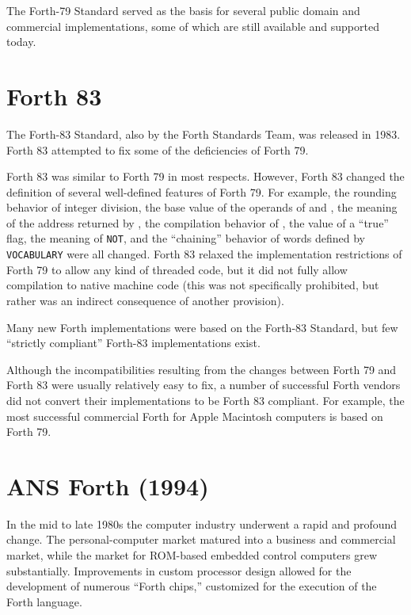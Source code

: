 The Forth-79 Standard served as the basis for several public domain
and commercial implementations, some of which are still available and
supported today.


\section{Forth 83} %

The Forth-83 Standard, also by the Forth Standards Team, was released
in 1983. Forth 83 attempted to fix some of the deficiencies of Forth
79.

Forth 83 was similar to Forth 79 in most respects. However, Forth 83
changed the definition of several well-defined features of Forth 79.
For example, the rounding behavior of integer division, the base value
of the operands of  and , the meaning of the
address returned by , the compilation behavior of ,
the value of a ``true'' flag, the meaning of \texttt{NOT}, and the
``chaining'' behavior of words defined by \texttt{VOCABULARY} were all
changed. Forth 83 relaxed the implementation restrictions of Forth 79
to allow any kind of threaded code, but it did not fully allow
compilation to native machine code (this was not specifically prohibited,
but rather was an indirect consequence of another provision).

Many new Forth implementations were based on the Forth-83 Standard, but
few ``strictly compliant'' Forth-83 implementations exist.

Although the incompatibilities resulting from the changes between
Forth 79 and Forth 83 were usually relatively easy to fix, a number
of successful Forth vendors did not convert their implementations to
be Forth 83 compliant. For example, the most successful commercial
Forth for Apple Macintosh computers is based on Forth 79.


\section{ANS Forth (1994)} %
\label{diff:ans}

In the mid to late 1980s the computer industry underwent a rapid and
profound change.  The personal-computer market matured into a business
and commercial market, while the market for ROM-based embedded control
computers grew substantially.  Improvements in custom processor design
allowed for the de\-vel\-op\-ment of numerous ``Forth chips,'' customized
for the execution of the Forth language.

